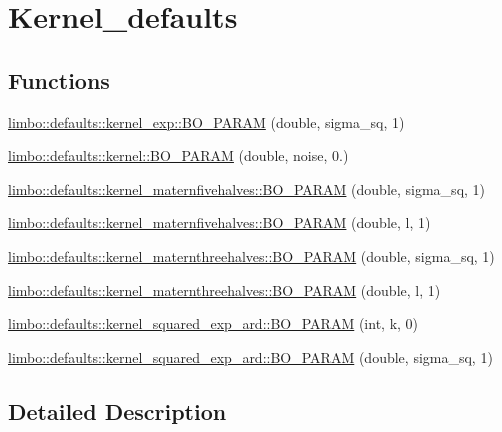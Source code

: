 \hypertarget{group__kernel__defaults}{}\section{Kernel\+\_\+defaults}
\label{group__kernel__defaults}
\subsection*{Functions}
\begin{DoxyCompactItemize}
\item 
\hyperlink{group__kernel__defaults_ga202b52540fa68b47005cd9e3ef61a3fe}{limbo\+::defaults\+::kernel\+\_\+exp\+::\+B\+O\+\_\+\+P\+A\+R\+AM} (double, sigma\+\_\+sq, 1)
\item 
\hyperlink{group__kernel__defaults_ga1e00e239557bb13005f591458aa41ac7}{limbo\+::defaults\+::kernel\+::\+B\+O\+\_\+\+P\+A\+R\+AM} (double, noise, 0.)
\item 
\hyperlink{group__kernel__defaults_ga001b0195485017f316c32002aba15139}{limbo\+::defaults\+::kernel\+\_\+maternfivehalves\+::\+B\+O\+\_\+\+P\+A\+R\+AM} (double, sigma\+\_\+sq, 1)
\item 
\hyperlink{group__kernel__defaults_gabc34e7cdebd3b2db4ffa355ac8eb51e9}{limbo\+::defaults\+::kernel\+\_\+maternfivehalves\+::\+B\+O\+\_\+\+P\+A\+R\+AM} (double, l, 1)
\item 
\hyperlink{group__kernel__defaults_ga76321c51e14ac1db904dd1411771e391}{limbo\+::defaults\+::kernel\+\_\+maternthreehalves\+::\+B\+O\+\_\+\+P\+A\+R\+AM} (double, sigma\+\_\+sq, 1)
\item 
\hyperlink{group__kernel__defaults_ga5e0b13e8fe6cc8b335d86ed94631225d}{limbo\+::defaults\+::kernel\+\_\+maternthreehalves\+::\+B\+O\+\_\+\+P\+A\+R\+AM} (double, l, 1)
\item 
\hyperlink{group__kernel__defaults_ga913157eccae4e432cb2fd43ec682773c}{limbo\+::defaults\+::kernel\+\_\+squared\+\_\+exp\+\_\+ard\+::\+B\+O\+\_\+\+P\+A\+R\+AM} (int, k, 0)
\item 
\hyperlink{group__kernel__defaults_ga5322933a812efe2019e375cd2b4875fc}{limbo\+::defaults\+::kernel\+\_\+squared\+\_\+exp\+\_\+ard\+::\+B\+O\+\_\+\+P\+A\+R\+AM} (double, sigma\+\_\+sq, 1)
\end{DoxyCompactItemize}


\subsection{Detailed Description}


